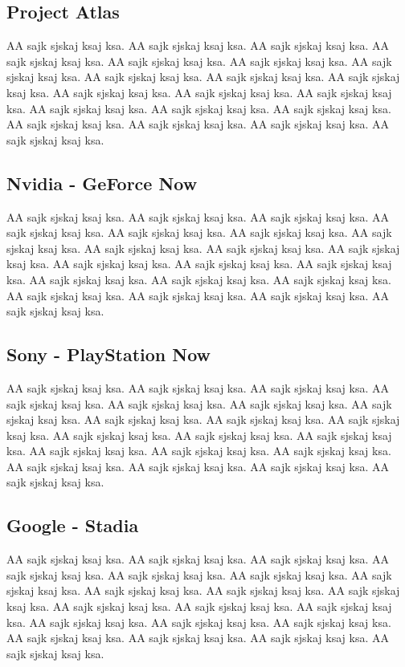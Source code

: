 \subsection{Project Atlas}
AA sajk sjskaj ksaj ksa. AA sajk sjskaj ksaj ksa. AA sajk sjskaj ksaj ksa. AA sajk sjskaj ksaj ksa. AA sajk sjskaj ksaj ksa. AA sajk sjskaj ksaj ksa. AA sajk sjskaj ksaj ksa. AA sajk sjskaj ksaj ksa. AA sajk sjskaj ksaj ksa. AA sajk sjskaj ksaj ksa. AA sajk sjskaj ksaj ksa. AA sajk sjskaj ksaj ksa. AA sajk sjskaj ksaj ksa. AA sajk sjskaj ksaj ksa. AA sajk sjskaj ksaj ksa. AA sajk sjskaj ksaj ksa. AA sajk sjskaj ksaj ksa. AA sajk sjskaj ksaj ksa. AA sajk sjskaj ksaj ksa. AA sajk sjskaj ksaj ksa\cite{Xbox_Game_Pass_cloud_gaming}.
\subsection{Nvidia - GeForce Now}
AA sajk sjskaj ksaj ksa. AA sajk sjskaj ksaj ksa. AA sajk sjskaj ksaj ksa. AA sajk sjskaj ksaj ksa. AA sajk sjskaj ksaj ksa. AA sajk sjskaj ksaj ksa. AA sajk sjskaj ksaj ksa. AA sajk sjskaj ksaj ksa. AA sajk sjskaj ksaj ksa. AA sajk sjskaj ksaj ksa. AA sajk sjskaj ksaj ksa. AA sajk sjskaj ksaj ksa. AA sajk sjskaj ksaj ksa. AA sajk sjskaj ksaj ksa. AA sajk sjskaj ksaj ksa. AA sajk sjskaj ksaj ksa. AA sajk sjskaj ksaj ksa. AA sajk sjskaj ksaj ksa. AA sajk sjskaj ksaj ksa. AA sajk sjskaj ksaj ksa\cite{GeForce_Now}.
\subsection{Sony - PlayStation Now}
AA sajk sjskaj ksaj ksa. AA sajk sjskaj ksaj ksa. AA sajk sjskaj ksaj ksa. AA sajk sjskaj ksaj ksa. AA sajk sjskaj ksaj ksa. AA sajk sjskaj ksaj ksa. AA sajk sjskaj ksaj ksa. AA sajk sjskaj ksaj ksa. AA sajk sjskaj ksaj ksa. AA sajk sjskaj ksaj ksa. AA sajk sjskaj ksaj ksa. AA sajk sjskaj ksaj ksa. AA sajk sjskaj ksaj ksa. AA sajk sjskaj ksaj ksa. AA sajk sjskaj ksaj ksa. AA sajk sjskaj ksaj ksa. AA sajk sjskaj ksaj ksa. AA sajk sjskaj ksaj ksa. AA sajk sjskaj ksaj ksa. AA sajk sjskaj ksaj ksa\cite{PlayStation_Now}.
\subsection{Google - Stadia}
AA sajk sjskaj ksaj ksa. AA sajk sjskaj ksaj ksa. AA sajk sjskaj ksaj ksa. AA sajk sjskaj ksaj ksa. AA sajk sjskaj ksaj ksa. AA sajk sjskaj ksaj ksa. AA sajk sjskaj ksaj ksa. AA sajk sjskaj ksaj ksa. AA sajk sjskaj ksaj ksa. AA sajk sjskaj ksaj ksa. AA sajk sjskaj ksaj ksa. AA sajk sjskaj ksaj ksa. AA sajk sjskaj ksaj ksa. AA sajk sjskaj ksaj ksa. AA sajk sjskaj ksaj ksa. AA sajk sjskaj ksaj ksa. AA sajk sjskaj ksaj ksa. AA sajk sjskaj ksaj ksa. AA sajk sjskaj ksaj ksa. AA sajk sjskaj ksaj ksa\cite{Google_Stadia}.

